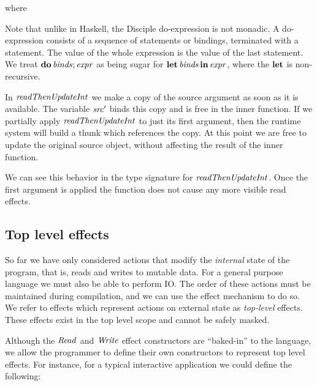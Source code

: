 \qq where 


\medskip

Note that unlike in Haskell, the Disciple do-expression is not monadic. A do-expression consists of a sequence of statements or bindings, terminated with a statement. The value of the whole expression is the value of the last statement. We treat $\textrm{\textbf{do}} \operatorname{\mathit{binds}}; \operatorname{\mathit{expr}}$ as being sugar for $\textrm{\textbf{let}} \operatorname{\mathit{binds}} \textrm{\textbf{in}} \operatorname{\mathit{expr}}$, where the $\textrm{\textbf{let}}$ is non-recursive. 

In $\operatorname{\mathit{readThenUpdateInt}}$ we make a copy of the source argument as soon as it is available. The variable $\operatorname{\mathit{src}}'$ binds this copy and is free in the inner function. If we partially apply $\operatorname{\mathit{readThenUpdateInt}}$ to just its first argument, then the runtime system will build a thunk which references the copy. At this point we are free to update the original source object, without affecting the result of the inner function. 

We can see this behavior in the type signature for $\operatorname{\mathit{readThenUpdateInt}}$. Once the first argument is applied the function does not cause any more visible read effects. 


\clearpage{}
\subsection{Top level effects}
So far we have only considered actions that modify the \emph{internal} state of the program, that is, reads and writes to mutable data. For a general purpose language we must also be able to perform IO. The order of these actions must be maintained during compilation, and we can use the effect mechanism to do so. We refer to effects which represent actions on external state as \emph{top-level} effects. These effects exist in the top level scope and cannot be safely masked.

Although the $\operatorname{\mathit{Read}}$ and $\operatorname{\mathit{Write}}$ effect constructors are ``baked-in'' to the language, we allow the programmer to define their own constructors to represent top level effects. For instance, for a typical interactive application we could define the following:

\code{
	$\keffect \ \iConsole$		\\
	$\keffect \ \iFileSystem$	\\
 	$\keffect \ \iNetwork$
}

